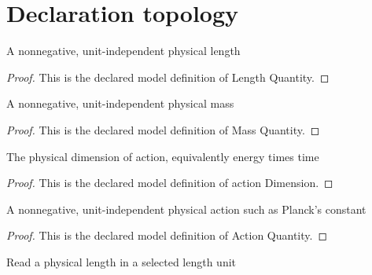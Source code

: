 \section{Declaration topology}
\begin{definition}
  \label{def:physics:phyx-mini-0584:phyxminiproblems-problemphyxmini0584-lengthquantity}
  A nonnegative, unit-independent physical length
\end{definition}
\begin{proof}
  This is the declared model definition of Length Quantity.
\end{proof}
\begin{definition}
  \label{def:physics:phyx-mini-0584:phyxminiproblems-problemphyxmini0584-massquantity}
  A nonnegative, unit-independent physical mass
\end{definition}
\begin{proof}
  This is the declared model definition of Mass Quantity.
\end{proof}
\begin{definition}
  \label{def:physics:phyx-mini-0584:phyxminiproblems-problemphyxmini0584-actiondimension}
  The physical dimension of action, equivalently energy times time
\end{definition}
\begin{proof}
  This is the declared model definition of action Dimension.
\end{proof}
\begin{definition}
  \label{def:physics:phyx-mini-0584:phyxminiproblems-problemphyxmini0584-actionquantity}
  A nonnegative, unit-independent physical action such as Planck's constant
\end{definition}
\begin{proof}
  This is the declared model definition of Action Quantity.
\end{proof}
\begin{definition}
  \label{def:physics:phyx-mini-0584:phyxminiproblems-problemphyxmini0584-lengthreadout}
  Read a physical length in a selected length unit
\end{definition}
